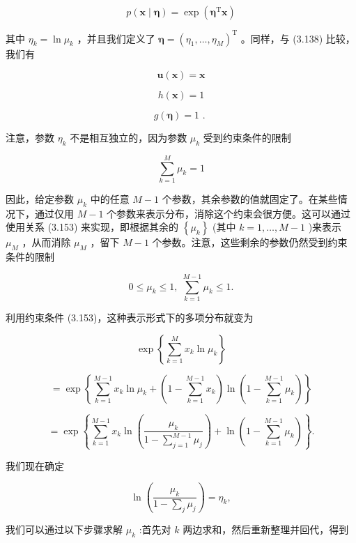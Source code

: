 \documentclass[10pt]{article}
\begin{document}
\[
p\left( {\mathbf{x} \mid  \mathbf{\eta }}\right)  = \exp \left( {{\mathbf{\eta }}^{\mathrm{T}}\mathbf{x}}\right)  \tag{3.149}
\]

其中 \({\eta }_{k} = \ln {\mu }_{k}\) ，并且我们定义了 \(\mathbf{\eta } = {\left( {\eta }_{1},\ldots ,{\eta }_{M}\right) }^{\mathrm{T}}\) 。同样，与 (3.138) 比较，我们有

\[
\mathbf{u}\left( \mathbf{x}\right)  = \mathbf{x} \tag{3.150}
\]

\[
h\left( \mathbf{x}\right)  = 1 \tag{3.151}
\]

\[
g\left( \mathbf{\eta }\right)  = 1\text{ . } \tag{3.152}
\]

注意，参数 \({\eta }_{k}\) 不是相互独立的，因为参数 \({\mu }_{k}\) 受到约束条件的限制

\[
\mathop{\sum }\limits_{{k = 1}}^{M}{\mu }_{k} = 1 \tag{3.153}
\]

因此，给定参数 \({\mu }_{k}\) 中的任意 \(M - 1\) 个参数，其余参数的值就固定了。在某些情况下，通过仅用 \(M - 1\) 个参数来表示分布，消除这个约束会很方便。这可以通过使用关系 (3.153) 来实现，即根据其余的 \(\left\{  {\mu }_{k}\right\}\) (其中 \(k = 1,\ldots ,M - 1\) )来表示 \({\mu }_{M}\) ，从而消除 \({\mu }_{M}\) ，留下 \(M - 1\) 个参数。注意，这些剩余的参数仍然受到约束条件的限制

\[
0 \leq  {\mu }_{k} \leq  1,\;\mathop{\sum }\limits_{{k = 1}}^{{M - 1}}{\mu }_{k} \leq  1. \tag{3.154}
\]

利用约束条件 (3.153)，这种表示形式下的多项分布就变为

\[
\exp \left\{  {\mathop{\sum }\limits_{{k = 1}}^{M}{x}_{k}\ln {\mu }_{k}}\right\}
\]

\[
= \exp \left\{  {\mathop{\sum }\limits_{{k = 1}}^{{M - 1}}{x}_{k}\ln {\mu }_{k} + \left( {1 - \mathop{\sum }\limits_{{k = 1}}^{{M - 1}}{x}_{k}}\right) \ln \left( {1 - \mathop{\sum }\limits_{{k = 1}}^{{M - 1}}{\mu }_{k}}\right) }\right\}
\]

\[
= \exp \left\{  {\mathop{\sum }\limits_{{k = 1}}^{{M - 1}}{x}_{k}\ln \left( \frac{{\mu }_{k}}{1 - \mathop{\sum }\limits_{{j = 1}}^{{M - 1}}{\mu }_{j}}\right)  + \ln \left( {1 - \mathop{\sum }\limits_{{k = 1}}^{{M - 1}}{\mu }_{k}}\right) }\right\}  . \tag{3.155}
\]

我们现在确定

\[
\ln \left( \frac{{\mu }_{k}}{1 - \mathop{\sum }\limits_{j}{\mu }_{j}}\right)  = {\eta }_{k}, \tag{3.156}
\]

我们可以通过以下步骤求解 \({\mu }_{k}\) :首先对 \(k\) 两边求和，然后重新整理并回代，得到
\end{document}
